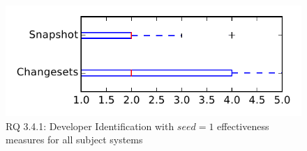 
\begin{figure}
\centering
\includegraphics[height=0.4\textheight]{figures/dit_seed/rq1_tiny_1}
\caption{RQ 3.4.1: Developer Identification with $seed=1$ effectiveness measures for all subject systems}
\label{fig:dit_seed:rq1:tiny}
\end{figure}
